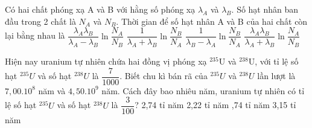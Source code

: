 \begin{vidu}%
Có hai chất phóng xạ A và B với hằng số phóng xạ $\lambda_A$ và $\lambda_B$. Số hạt nhân ban đầu trong 2 chất là $N_A$ và $N_B$. Thời gian để số hạt nhân A và B của hai chất còn lại bằng nhau là
\choice
{$\dfrac{\lambda_A\lambda_B}{\lambda_A-\lambda_B}\ln \dfrac{N_A}{N_B} $}
{$\dfrac{1}{\lambda_A+\lambda_B}\ln \dfrac{N_B}{N_A}$}
{\True $\dfrac{1}{\lambda_B-\lambda_A}\ln \dfrac{N_B}{N_A}$}
{$\dfrac{\lambda_A\lambda_B}{\lambda_A+\lambda_B}\ln \dfrac{N_A}{N_B}$}
\end{vidu}
\begin{vidu}%
	 Hiện nay uranium tự nhiên chứa hai đồng vị phóng xạ $^{235}\mathrm {U}$ và $^ {238} \mathrm {U}$, với tỉ lệ số hạt $^{235}{U}$ và số hạt $^{238}{U}$  là $\dfrac{7}{1000}$. Biết chu kì bán rã của  $^{235}{U}$ và $^{238}U$ lần lượt là $7,00.10^8$ năm và $4,50.10^9$ năm. Cách đây bao nhiêu năm, uranium tự nhiên có tỉ lệ số hạt $^{235}U$ và số hạt $^{238}U$ là $\dfrac{3}{100}$?
	\choice
	{2,74 tỉ năm}
	{2,22 tỉ năm}
	{,74 tỉ năm}
	{3,15 tỉ năm}
\end{vidu}






















